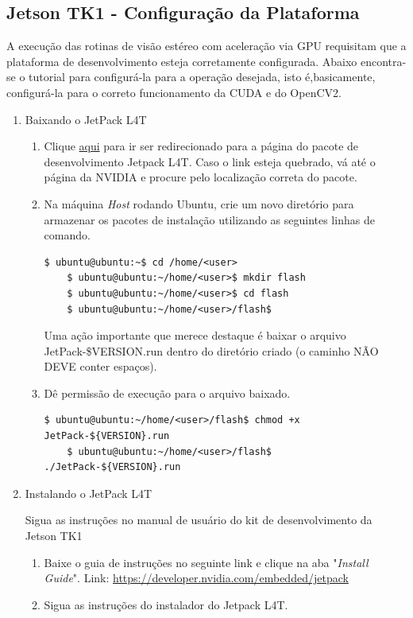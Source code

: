 \subsection{Jetson TK1 - Configuração da Plataforma}

A execução das rotinas de visão estéreo com aceleração via GPU requisitam que a plataforma de desenvolvimento esteja corretamente configurada. Abaixo encontra-se o tutorial para configurá-la para a operação desejada, isto é,basicamente, configurá-la para o correto funcionamento da CUDA e do OpenCV2. 

\begin{enumerate}
  \item Baixando o JetPack L4T
    \begin{enumerate}
      \item Clique \href{http://docs.nvidia.com/jetpack-l4t/index.html#developertools/mobile/jetpack/jetpack_l4t/2.1/jetpack_l4t_install.htm}{aqui} para ir ser redirecionado para a página do pacote de desenvolvimento Jetpack L4T. Caso o link esteja quebrado, vá até o página da NVIDIA e procure pelo localização correta do pacote.  

      \item Na máquina \textit{Host} rodando Ubuntu, crie um novo diretório para armazenar os pacotes de instalação utilizando as seguintes linhas de comando.
      \begin{lstlisting}[basicstyle=\tiny]
	$ ubuntu@ubuntu:~$ cd /home/<user>
	$ ubuntu@ubuntu:~/home/<user>$ mkdir flash
	$ ubuntu@ubuntu:~/home/<user>$ cd flash
	$ ubuntu@ubuntu:~/home/<user>/flash$ 
      \end{lstlisting}
      Uma ação importante que merece destaque é baixar o arquivo JetPack-\${VERSION}.run dentro do diretório criado (o caminho NÃO DEVE conter espaços).
      
      \item Dê permissão de execução para o arquivo baixado. 
      \begin{lstlisting}[basicstyle=\tiny]
	$ ubuntu@ubuntu:~/home/<user>/flash$ chmod +x JetPack-${VERSION}.run
	$ ubuntu@ubuntu:~/home/<user>/flash$ ./JetPack-${VERSION}.run
      \end{lstlisting}
      
      
    \end{enumerate}
  \item Instalando o JetPack L4T
  
    Sigua as instruções no manual de usuário do kit de desenvolvimento da Jetson TK1
    \begin{enumerate}
      \item Baixe o guia de instruções no seguinte link e clique na aba "\textit{Install Guide}". Link: \url{https://developer.nvidia.com/embedded/jetpack}
      \item Sigua as instruções do instalador do Jetpack L4T.
     

\end{enumerate}
\end{enumerate}
